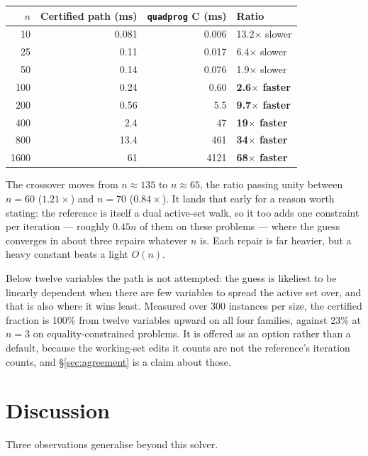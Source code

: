 \documentclass[11pt,a4paper]{article}
\theoremstyle{plain}
\theoremstyle{remark}
\begin{document}
\begin{center}
\begin{tabular}{r r r l}
  \toprule
  $n$ & Certified path (ms) & {\texttt{quadprog} C (ms)} & Ratio \\
  \midrule
  10   & 0.081 & 0.006 & 13.2$\times$ slower \\
  25   & 0.11  & 0.017 & 6.4$\times$ slower \\
  50   & 0.14  & 0.076 & 1.9$\times$ slower \\
  100  & 0.24  & 0.60  & \textbf{2.6$\times$ faster} \\
  200  & 0.56  & 5.5   & \textbf{9.7$\times$ faster} \\
  400  & 2.4   & 47    & \textbf{19$\times$ faster} \\
  800  & 13.4  & 461   & \textbf{34$\times$ faster} \\
  1600 & 61    & 4121  & \textbf{68$\times$ faster} \\
  \bottomrule
\end{tabular}
\end{center}

The crossover moves from $n \approx 135$ to $n \approx 65$, the ratio passing
unity between $n = 60$ ($1.21\times$) and $n = 70$ ($0.84\times$). It lands that
early for a reason worth stating: the reference is itself a dual active-set walk,
so it too adds one constraint per iteration --- roughly $0.45n$ of them on these
problems --- where the guess converges in about three repairs whatever $n$ is.
Each repair is far heavier, but a heavy constant beats a light $O(n)$.

Below twelve variables the path is not attempted: the guess is likeliest to be
linearly dependent when there are few variables to spread the active set over, and
that is also where it wins least. Measured over 300 instances per size, the
certified fraction is 100\% from twelve variables upward on all four families,
against 23\% at $n = 3$ on equality-constrained problems. It is offered as an
option rather than a default, because the working-set edits it counts are not the
reference's iteration counts, and \S\ref{sec:agreement} is a claim about those.

\section{Discussion}
\label{sec:discussion}

Three observations generalise beyond this solver.
\end{document}

